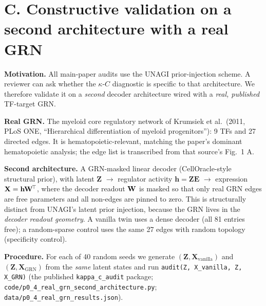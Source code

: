 \documentclass[11 pt,a4 paper]{article}
\newcommand{\Emat}{\mathbf{E}}\newcommand{\Zmat}{\mathbf{Z}}\newcommand{\Xmat}{\mathbf{X}}
\begin{document}
\section*{C. Constructive validation on a second architecture with a real GRN}

\textbf{Motivation.} All main-paper audits use the UNAGI prior-injection scheme.
A reviewer can ask whether the $\kappa$-$C$ diagnostic is specific to that
architecture. We therefore validate it on a \emph{second} decoder architecture
wired with a \emph{real, published} TF-target GRN.

\textbf{Real GRN.} The myeloid core regulatory network of Krumsiek et al.\ (2011,
PLoS ONE, ``Hierarchical differentiation of myeloid progenitors''): 9 TFs and 27
directed edges. It is hematopoietic-relevant, matching the paper's dominant
hematopoietic analysis; the edge list is transcribed from that source's Fig.~1 A.

\textbf{Second architecture.} A GRN-masked linear decoder (CellOracle-style
structural prior), with latent $\Zmat$ $\to$ regulator activity $\mathbf{h}=\Zmat\Emat$
$\to$ expression $\Xmat=\mathbf{h}\Wmat^{\!\top}$, where the decoder readout
$\mathbf{W}$ is masked so that only real GRN edges are free parameters and all
non-edges are pinned to zero. This is structurally distinct from UNAGI's latent
prior injection, because the GRN lives in the \emph{decoder readout geometry}. A vanilla
twin uses a dense decoder (all 81 entries free); a random-sparse control uses the
same 27 edges with random topology (specificity control).

\textbf{Procedure.} For each of 40 random seeds we generate
$(\Zmat,\Xmat_{\mathrm{vanilla}})$ and $(\Zmat,\Xmat_{\mathrm{GRN}})$ from the
\emph{same} latent states and run
\texttt{audit(Z, X\_vanilla, Z, X\_GRN)}
(the published \texttt{kappa\_c\_audit} package;
\texttt{code/p0\_4\_real\_grn\_second\_architecture.py};
\texttt{data/p0\_4\_real\_grn\_results.json}).
\end{document}
